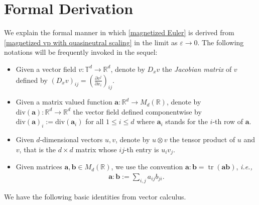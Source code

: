 \documentclass[11pt,reqno]{amsart}
\numberwithin{equation}{section}
\begin{document}
\section{Formal Derivation}\label{sec formal derivation}
We explain the formal manner in which \eqref{magnetized Euler} is derived from \eqref{magnetized vp with quasineutral scaling} in the limit as $\varepsilon \rightarrow 0$. The following notations will be frequently invoked in the sequel: 
\begin{itemize} 
\item[{\rm(a)}]Given a vector field $v:\mathbb{T}^{d}\rightarrow \mathbb{R}^{d}$, 
denote by  $D_{x}v$ the \textit{Jacobian matrix} of $v$ defined by $(D_{x}v)_{ij}=(\frac{\partial v^{j}}{\partial x_{i}})_{ij}$. 
\item[{\rm(b)}] Given a matrix valued function $\mathbf{a}:\mathbb{R}^{d}\rightarrow M_{d}(\mathbb{R})$, denote by $\mathrm{div}(\mathbf{a}):\mathbb{R}^{d}\rightarrow \mathbb{R}^{d}$ the vector field defined componentwise by  $\mathrm{div}(\mathbf{a})_{i}:=\mathrm{div}(\mathbf{a}_{i})$ for all $1\leq i\leq d$ where $\mathbf{a}_{i}$ stands for  the $i$-th row of $\mathbf{a}$. 
\item[{\rm(c)}] 
Given $d$-dimensional vectors $u,v$, denote by $u\otimes v$ the tensor product of $u$ and $v$, 
that is the $d\times d$ matrix whose $ij$-th entry is $u_{i}v_{j}$.
\item[{\rm(d)}] Given matrices $\mathbf{a},\mathbf{b}\in M_{d}(\mathbb{R})$, 
we use the convention $\mathbf{a}:\mathbf{b}=\operatorname{tr}(\mathbf{a}\mathbf{b})$, {\it i.e.,} 
    \begin{align*}
\mathbf{a}:\mathbf{b}:=\sum_{i,j}a_{ij}b_{ji}.    
    \end{align*}
\end{itemize}
We have the following basic identities from vector calculus. 
\end{document}
